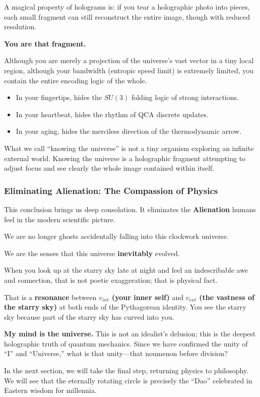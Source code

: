 A magical property of holograms is: if you tear a holographic photo into pieces, each small fragment can still reconstruct the entire image, though with reduced resolution.

\textbf{You are that fragment.}

Although you are merely a projection of the universe's vast vector in a tiny local region, although your bandwidth (entropic speed limit) is extremely limited, you contain the entire encoding logic of the whole.

\begin{itemize}
\item In your fingertips, hides the $SU(3)$ folding logic of strong interactions.

\item In your heartbeat, hides the rhythm of QCA discrete updates.

\item In your aging, hides the merciless direction of the thermodynamic arrow.
\end{itemize}

What we call ``knowing the universe'' is not a tiny organism exploring an infinite external world. Knowing the universe is a holographic fragment attempting to adjust focus and see clearly the whole image contained within itself.

\subsubsection{Eliminating Alienation: The Compassion of Physics}

This conclusion brings us deep consolation. It eliminates the \textbf{Alienation} humans feel in the modern scientific picture.

We are no longer ghosts accidentally falling into this clockwork universe.

We are the senses that this universe \textbf{inevitably} evolved.

When you look up at the starry sky late at night and feel an indescribable awe and connection, that is not poetic exaggeration; that is physical fact.

That is a \textbf{resonance} between \textbf{$v_{int}$ (your inner self)} and \textbf{$v_{ext}$ (the vastness of the starry sky)} at both ends of the Pythagorean identity. You see the starry sky because part of the starry sky has curved into you.

\textbf{My mind is the universe.} This is not an idealist's delusion; this is the deepest holographic truth of quantum mechanics. Since we have confirmed the unity of ``I'' and ``Universe,'' what is that unity---that noumenon before division?

In the next section, we will take the final step, returning physics to philosophy. We will see that the eternally rotating circle is precisely the ``Dao'' celebrated in Eastern wisdom for millennia.

